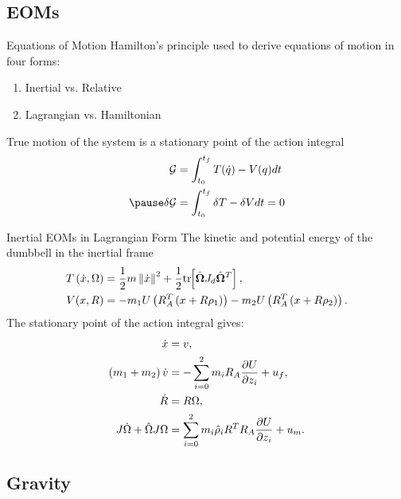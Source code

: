 \subsection{EOMs}



\begin{frame}{Equations of Motion}
    Hamilton's principle used to derive equations of motion in four forms:
    \begin{enumerate}
        \item Inertial vs. Relative 
        \item Lagrangian vs. Hamiltonian
    \end{enumerate}
    True motion of the system is a stationary point of the action integral
    \begin{align*}
        \mathcal{G} &= \int_{t_0}^{t_f} T(\dot q) - V(q) dt\\
        \pause
        \delta \mathcal{G} &= \int_{t_0}^{t_f} \delta T - \delta V dt = 0
    \end{align*}
\end{frame}

\begin{frame}{Inertial EOMs in Lagrangian Form}
    The kinetic and potential energy of the dumbbell in the inertial frame
    \begin{align*}
        T\left( \dot{x}, \Omega \right) &= \frac{1}{2} m \left\| \dot{x} \right\|^2 + \frac{1}{2} \mathrm{tr}\negthickspace\left[ \hat{\bm{\Omega}} J_d \hat{\bm{\Omega}}^T \right] , \\
        V( x, R ) &=  - m_1 U \left( R_A^T \left( x + R \rho_1 \right) \right) - m_2 U \left( R_A^T \left( x + R \rho_2 \right) \right). 
    \end{align*}
    \pause
    The stationary point of the action integral gives:
    \begin{align*}
        \dot{x} &= v, \\
        \left( m_1 + m_2 \right) \dot{v} &= - \sum_{i=0}^2 m_i R_A \frac{\partial U}{\partial z_i} + u_f, \\
        \dot{R} &= R \Omega, \\
        J \dot{\Omega} + \hat{\Omega} J \Omega &= \sum_{i=0}^2 m_i \hat{\rho}_i R^T R_A \frac{\partial U}{\partial z_i} + u_m. 
    \end{align*}
\end{frame}

\subsection{Gravity}

